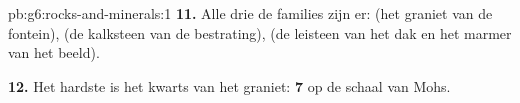 \begin{solution}{pb:g6:rocks-and-minerals:1}
\textbf{11.} Alle drie de families zijn er:  (het graniet
van de fontein),  (de kalksteen van de bestrating),
 (de leisteen van het dak en het marmer van het beeld).

\textbf{12.} Het hardste  is het kwarts van het graniet: 
\textbf{7} op de schaal van Mohs.
\end{solution}
